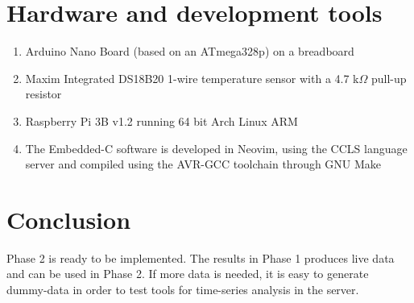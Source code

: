 \documentclass[10pt]{article}
\begin{document}
\section*{Hardware and development tools}%
\label{sec:hardware_and_development_tools}
\begin{enumerate}
  \item Arduino Nano Board (based on an ATmega328p) on a breadboard \cite{atmega328p}
  \item Maxim Integrated DS18B20 1-wire temperature sensor with a 4.7 k$\Omega$ pull-up resistor \cite{interfaceDS18B20}
  \item Raspberry Pi 3B v1.2 running 64 bit Arch Linux ARM \cite{alarmv8}
  \item The Embedded-C software is developed in Neovim, using the CCLS language server and compiled using the AVR-GCC toolchain through GNU Make
\end{enumerate}
\section*{Conclusion}%
\label{sec:conclusion}

Phase 2 is ready to be implemented. The results in Phase 1 produces live data and can be used in Phase 2. If more data is needed, it is easy to generate dummy-data in order to test tools for time-series analysis in the server.

\newpage
\printbibliography
\end{document}

